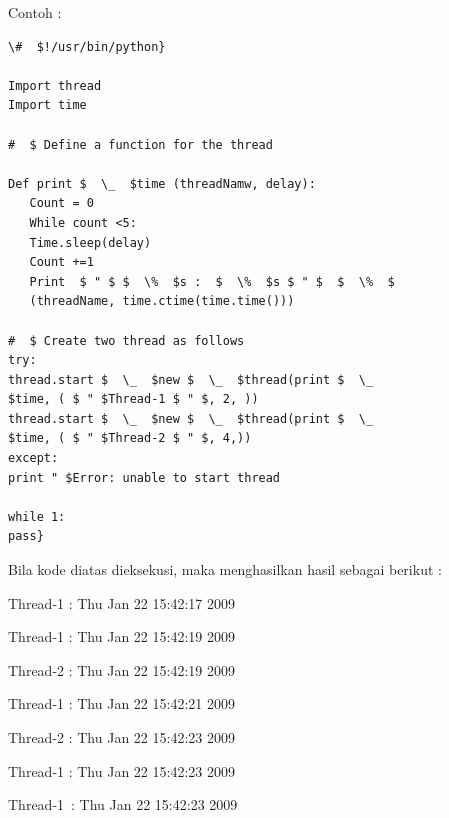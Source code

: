 \vspace{12pt}
Contoh : 
\begin{verbatim}
\#  $!/usr/bin/python} 

Import thread
Import time

#  $ Define a function for the thread 
 
Def print $  \_  $time (threadNamw, delay):
   Count = 0
   While count <5:
   Time.sleep(delay)
   Count +=1 
   Print  $ " $ $  \%  $s :  $  \%  $s $ " $  $  \%  $ 
   (threadName, time.ctime(time.time()))
 
#  $ Create two thread as follows
try:
thread.start $  \_  $new $  \_  $thread(print $  \_  
$time, ( $ " $Thread-1 $ " $, 2, ))
thread.start $  \_  $new $  \_  $thread(print $  \_  
$time, ( $ " $Thread-2 $ " $, 4,))
except: 
print " $Error: unable to start thread 

while 1:
pass} 
\end{verbatim}

\vspace{80pt}
Bila kode diatas dieksekusi, maka menghasilkan hasil sebagai berikut : 
\vspace{10pt}
 
\begin{center}{\fontsize{10pt}{10pt}\selectfont Thread-1 : Thu Jan 22 15:42:17 2009}\end{center} 
 
\begin{center}{\fontsize{10pt}{10pt}\selectfont Thread-1 : Thu Jan 22 15:42:19 2009}\end{center} 
 
\begin{center}{\fontsize{10pt}{10pt}\selectfont Thread-2 : Thu Jan 22 15:42:19 2009}\end{center} 
 
\begin{center}{\fontsize{10pt}{10pt}\selectfont Thread-1 : Thu Jan 22 15:42:21 2009}\end{center} 
 
\begin{center}{\fontsize{10pt}{10pt}\selectfont Thread-2 : Thu Jan 22 15:42:23 2009}\end{center} 
 
\begin{center}{\fontsize{10pt}{10pt}\selectfont Thread-1 : Thu Jan 22 15:42:23 2009}\end{center} 
 
\begin{center}{\fontsize{10pt}{10pt}\selectfont Thread-1~:  Thu Jan 22 15:42:23 2009}\end{center} 
 
